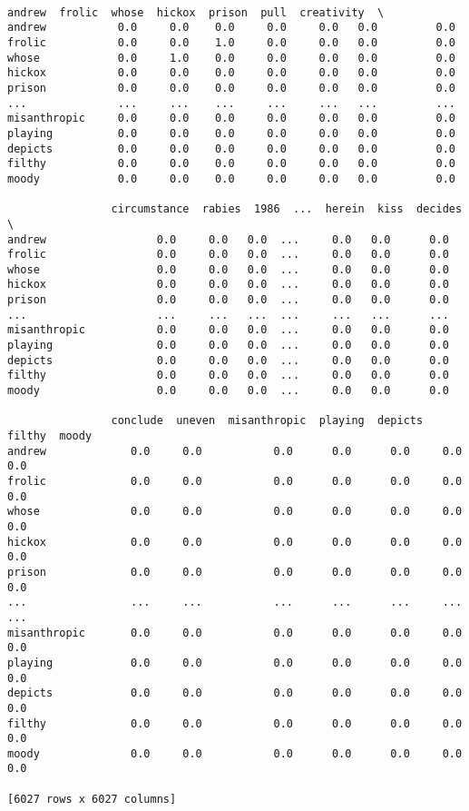 \documentclass[12pt, letterpaper]{article}
\begin{document}
\begin{lstlisting}

andrew  frolic  whose  hickox  prison  pull  creativity  \
andrew           0.0     0.0    0.0     0.0     0.0   0.0         0.0   
frolic           0.0     0.0    1.0     0.0     0.0   0.0         0.0   
whose            0.0     1.0    0.0     0.0     0.0   0.0         0.0   
hickox           0.0     0.0    0.0     0.0     0.0   0.0         0.0   
prison           0.0     0.0    0.0     0.0     0.0   0.0         0.0   
...              ...     ...    ...     ...     ...   ...         ...   
misanthropic     0.0     0.0    0.0     0.0     0.0   0.0         0.0   
playing          0.0     0.0    0.0     0.0     0.0   0.0         0.0   
depicts          0.0     0.0    0.0     0.0     0.0   0.0         0.0   
filthy           0.0     0.0    0.0     0.0     0.0   0.0         0.0   
moody            0.0     0.0    0.0     0.0     0.0   0.0         0.0   

                circumstance  rabies  1986  ...  herein  kiss  decides  \
andrew                 0.0     0.0   0.0  ...     0.0   0.0      0.0   
frolic                 0.0     0.0   0.0  ...     0.0   0.0      0.0   
whose                  0.0     0.0   0.0  ...     0.0   0.0      0.0   
hickox                 0.0     0.0   0.0  ...     0.0   0.0      0.0   
prison                 0.0     0.0   0.0  ...     0.0   0.0      0.0   
...                    ...     ...   ...  ...     ...   ...      ...   
misanthropic           0.0     0.0   0.0  ...     0.0   0.0      0.0   
playing                0.0     0.0   0.0  ...     0.0   0.0      0.0   
depicts                0.0     0.0   0.0  ...     0.0   0.0      0.0   
filthy                 0.0     0.0   0.0  ...     0.0   0.0      0.0   
moody                  0.0     0.0   0.0  ...     0.0   0.0      0.0   

                conclude  uneven  misanthropic  playing  depicts  filthy  moody  
andrew             0.0     0.0           0.0      0.0      0.0     0.0    0.0  
frolic             0.0     0.0           0.0      0.0      0.0     0.0    0.0  
whose              0.0     0.0           0.0      0.0      0.0     0.0    0.0  
hickox             0.0     0.0           0.0      0.0      0.0     0.0    0.0  
prison             0.0     0.0           0.0      0.0      0.0     0.0    0.0  
...                ...     ...           ...      ...      ...     ...    ...  
misanthropic       0.0     0.0           0.0      0.0      0.0     0.0    0.0  
playing            0.0     0.0           0.0      0.0      0.0     0.0    0.0  
depicts            0.0     0.0           0.0      0.0      0.0     0.0    0.0  
filthy             0.0     0.0           0.0      0.0      0.0     0.0    0.0  
moody              0.0     0.0           0.0      0.0      0.0     0.0    0.0  

[6027 rows x 6027 columns]
\end{lstlisting}
\end{document}
